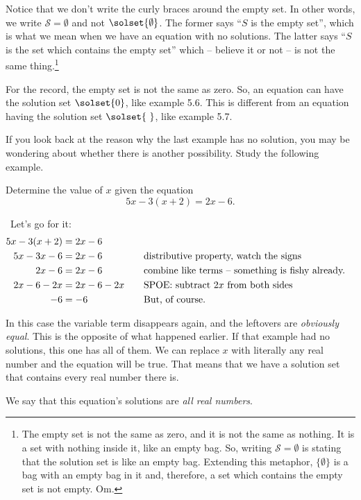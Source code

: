 Notice that we don't write the curly braces around the empty set. In other words, we write $\mathcal{S}=\emptyset$ and not $\solset{\emptyset}$. The former says ``$S$ is the empty set'', which is what we mean when we have an equation with no solutions. The latter says ``$S$ is the set which contains the empty set'' which -- believe it or not -- is not the same thing.\footnote{The empty set is not the same as zero, and it is not the same as nothing. It is a set with nothing inside it, like an empty bag. So, writing $\mathcal{S} = \emptyset$ is stating that the solution set is like an empty bag. Extending this metaphor, $\{\emptyset\}$ is a bag with an empty bag in it and, therefore, a set which contains the empty set is not empty. Om.}

For the record, the empty set is not the same as zero. So, an equation can have the solution set $\solset{0}$, like example 5.6. This is different from an equation having the solution set $\solset{~}$, like example 5.7.

If you look back at the reason why the last example has no solution, you may be wondering about whether there is another possibility. Study the following example.

\begin{boxex}
Determine the value of $x$ given the equation \[5x-3(x+2)=2x-6.\]

\exsoln\ Let's go for it:
\[\begin{aligned}
5x-3(x+2) &= 2x-6\\
5x-3x-6 &= 2x-6
&&\text{\quad distributive property, watch the signs}\\
2x-6 &= 2x-6
&&\text{\quad combine like terms -- something is fishy already.}\\
2x-6-2x &= 2x-6-2x
&&\text{\quad SPOE: subtract $2x$ from both sides}\\
-6 &= -6
&&\text{\quad But, of course.}\\
\end{aligned}\]

In this case the variable term disappears again, and the leftovers are \textit{obviously equal}. This is the opposite of what happened earlier. If that example had no solutions, this one has all of them. We can replace $x$ with literally any real number and the equation will be true. That means that we have a solution set that contains every real number there is.

We say that this equation's solutions are \textit{all real numbers}.
\end{boxex}

